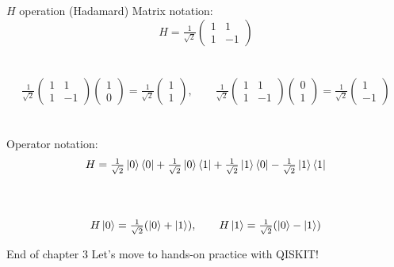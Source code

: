 \documentclass[aspectratio=169,12pt]{beamer}
\begin{document}
\begin{frame}{$H$ operation (Hadamard)}
  Matrix notation:
  $$
    H = \tfrac{1}{\sqrt{2}}\begin{pmatrix}1 & 1 \\ 1 & -1\end{pmatrix}
  $$\\~\\
  $$
    \tfrac{1}{\sqrt{2}}\begin{pmatrix}1 & 1 \\ 1 & -1\end{pmatrix}
    \begin{pmatrix}1\\0\end{pmatrix}=
    \tfrac{1}{\sqrt{2}}\begin{pmatrix}1\\1\end{pmatrix},
    \qquad
    \tfrac{1}{\sqrt{2}}\begin{pmatrix}1 & 1 \\ 1 & -1\end{pmatrix}
    \begin{pmatrix}0\\1\end{pmatrix}=
    \tfrac{1}{\sqrt{2}}\begin{pmatrix}1\\-1\end{pmatrix}
  $$
  ~\\~\\
  Operator notation: $$H = \tfrac{1}{\sqrt{2}} \ket 0 \bra 0 + \tfrac{1}{\sqrt{2}} \ket 0 \bra 1 + \tfrac{1}{\sqrt{2}} \ket 1 \bra 0 - \tfrac{1}{\sqrt{2}} \ket 1 \bra 1$$\\~\\
  $$
    H\ket 0 = \tfrac{1}{\sqrt{2}}(\ket 0+\ket 1), \qquad
    H\ket 1 = \tfrac{1}{\sqrt{2}}(\ket 0-\ket 1)
  $$
\end{frame}

\begin{frame}{End of chapter 3}
  \centering
  \vfill
  Let's move to hands-on practice with QISKIT!
  \vfill
\end{frame}
\end{document}
